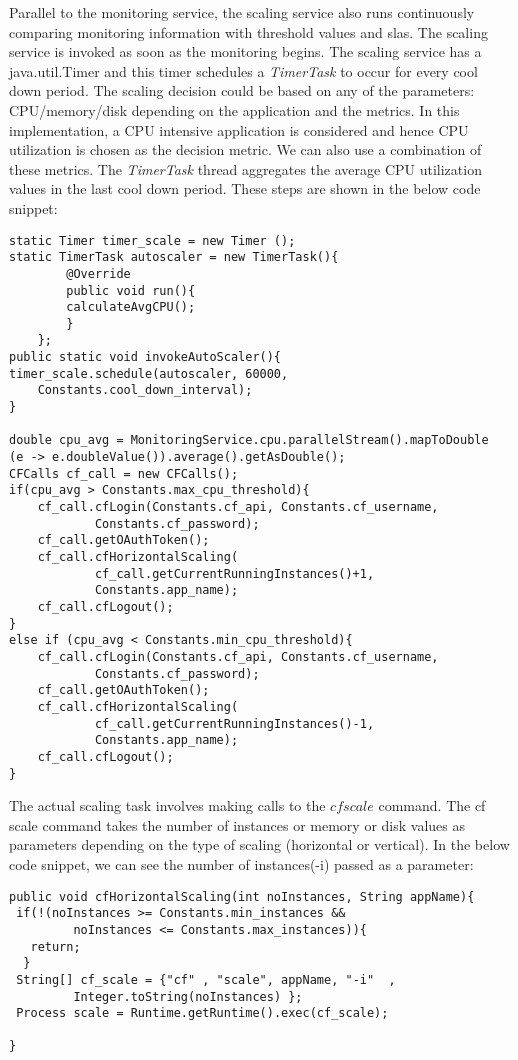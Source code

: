 \documentclass[article,type=msc,colorback,12pt,accentcolor=tud8b,table]{tudthesis}
\begin{document}
	Parallel to the monitoring service, the scaling service also runs continuously comparing monitoring information with threshold values and \gls{sla}s. The scaling service is invoked as soon as the monitoring begins. The scaling service has a java.util.Timer and this timer schedules a \textit{TimerTask} to occur for every cool down period. The scaling decision could be based on any of the parameters: CPU/memory/disk depending on the application and the metrics. In this implementation, a CPU intensive application is considered and hence CPU utilization is chosen as the decision metric. We can also use a combination of these metrics. The \textit{TimerTask} thread aggregates the average CPU utilization values in the last cool down period. These steps are shown in the below code snippet:	
\begin{lstlisting}
static Timer timer_scale = new Timer ();
static TimerTask autoscaler = new TimerTask(){
	 	@Override
	 	public void run(){
	 	calculateAvgCPU();
	 	}
 	};
public static void invokeAutoScaler(){
timer_scale.schedule(autoscaler, 60000, 
	Constants.cool_down_interval);
}

double cpu_avg = MonitoringService.cpu.parallelStream().mapToDouble
(e -> e.doubleValue()).average().getAsDouble();
CFCalls cf_call = new CFCalls();
if(cpu_avg > Constants.max_cpu_threshold){
	cf_call.cfLogin(Constants.cf_api, Constants.cf_username, 
			Constants.cf_password);
	cf_call.getOAuthToken();
	cf_call.cfHorizontalScaling(
			cf_call.getCurrentRunningInstances()+1, 
			Constants.app_name);
	cf_call.cfLogout();
}
else if (cpu_avg < Constants.min_cpu_threshold){
	cf_call.cfLogin(Constants.cf_api, Constants.cf_username, 
			Constants.cf_password);
	cf_call.getOAuthToken();
	cf_call.cfHorizontalScaling(
			cf_call.getCurrentRunningInstances()-1, 
			Constants.app_name);
	cf_call.cfLogout();
}
\end{lstlisting}
	The actual scaling task involves making calls to the $cf scale$ command. The \gls{cf} scale command takes the number of instances or memory or disk values as parameters depending on the type of scaling (horizontal or vertical). In the below code snippet, we can see the number of instances(-i) passed as a parameter:
	
	\begin{lstlisting}
public void cfHorizontalScaling(int noInstances, String appName){
 if(!(noInstances >= Constants.min_instances && 
		 noInstances <= Constants.max_instances)){
   return;
  }
 String[] cf_scale = {"cf" , "scale", appName, "-i"  , 
		 Integer.toString(noInstances) };
 Process scale = Runtime.getRuntime().exec(cf_scale);

}	
	\end{lstlisting}
	
\end{document}
